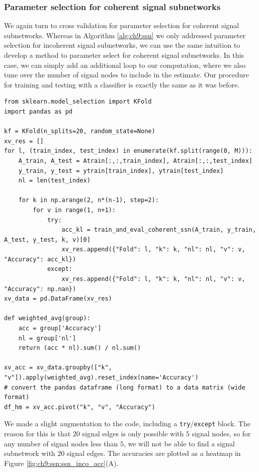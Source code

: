 \subsubsection{Parameter selection for coherent signal subnetworks}

We again turn to cross validation for parameter selection for coherent signal subnetworks. Whereas in Algorithm \ref{alg:ch9:ssn} we only addressed parameter selection for incoherent signal subnetworks, we can use the same intuition to develop a method to parameter select for coherent signal subnetworks. In this case, we can simply add an additional loop to our computation, where we also tune over the number of signal nodes to include in the estimate. Our procedure for training and testing with a classifier is exactly the same as it was before.

\begin{lstlisting}[style=python]
from sklearn.model_selection import KFold
import pandas as pd

kf = KFold(n_splits=20, random_state=None)
xv_res = []
for l, (train_index, test_index) in enumerate(kf.split(range(0, M))):
    A_train, A_test = Atrain[:,:,train_index], Atrain[:,:,test_index]
    y_train, y_test = ytrain[train_index], ytrain[test_index]
    nl = len(test_index)
    
    for k in np.arange(2, n*(n-1), step=2):
        for v in range(1, n+1):
            try:
                acc_kl = train_and_eval_coherent_ssn(A_train, y_train, A_test, y_test, k, v)[0]
                xv_res.append({"Fold": l, "k": k, "nl": nl, "v": v, "Accuracy": acc_kl})
            except:
                xv_res.append({"Fold": l, "k": k, "nl": nl, "v": v, "Accuracy": np.nan})
xv_data = pd.DataFrame(xv_res)

def weighted_avg(group):
    acc = group['Accuracy']
    nl = group['nl']
    return (acc * nl).sum() / nl.sum()

xv_acc = xv_data.groupby(["k", "v"]).apply(weighted_avg).reset_index(name='Accuracy')
# convert the pandas dataframe (long format) to a data matrix (wide format)
df_hm = xv_acc.pivot("k", "v", "Accuracy")
\end{lstlisting}

We made a slight augmentation to the code, including a \texttt{try}/\texttt{except} block. The reason for this is that $20$ signal edges is only possible with $5$ signal nodes, so for any number of signal nodes less than $5$, we will not be able to find a signal subnetwork with $20$ signal edges. The accuracies are plotted as a heatmap in Figure \ref{fig:ch9:ssn:ssn_inco_acc}(A). 

